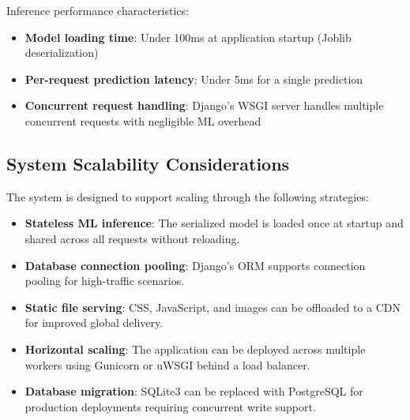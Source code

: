 Inference performance characteristics:

\begin{itemize}
    \item \textbf{Model loading time}: Under 100ms at application startup (Joblib deserialization)
    \item \textbf{Per-request prediction latency}: Under 5ms for a single prediction
    \item \textbf{Concurrent request handling}: Django's WSGI server handles multiple concurrent requests with negligible ML overhead
\end{itemize}

\subsection{System Scalability Considerations}

The system is designed to support scaling through the following strategies:

\begin{itemize}
    \item \textbf{Stateless ML inference}: The serialized model is loaded once at startup and shared across all requests without reloading.
    \item \textbf{Database connection pooling}: Django's ORM supports connection pooling for high-traffic scenarios.
    \item \textbf{Static file serving}: CSS, JavaScript, and images can be offloaded to a CDN for improved global delivery.
    \item \textbf{Horizontal scaling}: The application can be deployed across multiple workers using Gunicorn or uWSGI behind a load balancer.
    \item \textbf{Database migration}: SQLite3 can be replaced with PostgreSQL for production deployments requiring concurrent write support.
\end{itemize}
